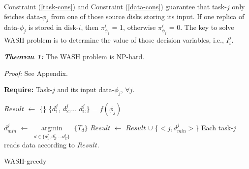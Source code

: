 \documentclass[conference]{IEEEtran}
\begin{document}
Constraint (\ref{task-cons}) and Constraint (\ref{data-cons}) guarantee that task-$j$ only fetches data-$\phi_j$ from one of those source disks storing its input. 
If one replica of data-$\phi_j$ is stored in disk-$i$, then $\pi_{\phi_j}^{i}$ = 1, otherwise $\pi_{\phi_j}^{i}$ = 0. 
The key to solve WASH problem is to determine the value of those decision variables, i.e., {$I_i^j$}. 


\emph{\textbf{Theorem 1:}} The WASH problem is NP-hard.

\emph{Proof:} See Appendix.

\begin{algorithm}

	\textbf{Require:} Task-$j$ and its input data-$\phi_j$, $\forall j$.

	\begin{algorithmic}[1]
		
		\State $Result$ $\gets$ \{\}\label{WASH-greedy:init}
			\State \{$d_{1}^j$, $d_{2}^j$,... $d_{C}^j$\} = $f(\phi_j)$
		
	
			\State $d_{min}^j$ $\gets$ $\mathop{\arg\min}\limits_{d \in \{d_{1}^j, d_{2}^j,... d_{C}^j\}}$ $\{T_d\}$
			\State $Result$ $\gets$ $Result$ $\cup$
			\{$< j, d_{min}^j>$\}
		\EndFor
	\State  Each task-$j$ reads data according to $Result$.
	\end{algorithmic}
	\caption{WASH-greedy}\label{WASH-greedy}
\end{algorithm}
\end{document}
